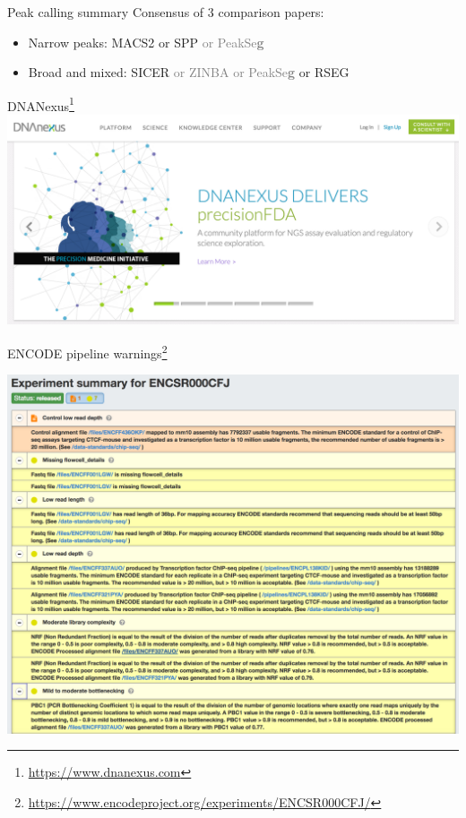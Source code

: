 \documentclass{beamer}
\begin{document}
\begin{frame}{Peak calling summary}
Consensus of 3 comparison papers:
\begin{itemize}
\item Narrow peaks: MACS2 or SPP \textcolor{gray}{or PeakSe\textbf{g}}
\item Broad and mixed: SICER \textcolor{gray}{or ZINBA or PeakSe\textbf{g}} or RSEG
\end{itemize}
\end{frame}

\begin{frame}{DNANexus\footnote{\url{https://www.dnanexus.com}}}
\includegraphics[width=\linewidth]{dnanexus.png}
\end{frame}

\begin{frame}{ENCODE pipeline warnings\footnote{\url{https://www.encodeproject.org/experiments/ENCSR000CFJ/}}}
\begin{center}
\includegraphics[height=0.8\paperheight]{encode_warnings.png}
\end{center}
\end{frame}
\end{document}
